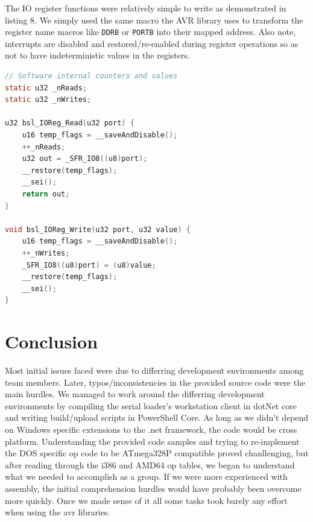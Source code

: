 \documentclass[11pt]{article}
\begin{document}
The IO register functions were relatively simple to write as demonstrated in listing 8. 
We simply used the same macro the AVR library uses to transform the register name macros like \lstinline[columns=fixed]{DDRB} or \lstinline[columns=fixed]{PORTB} into their mapped address.
Also note, interrupts are disabled and restored/re-enabled during register operations so as not to have indeterministic values in the registers.

\begin{center}
    \begin{lstlisting}[language=C, columns=fixed, caption=Register manipulation implementation from \_avr\_ioreg.c.]
// Software internal counters and values
static u32 _nReads;
static u32 _nWrites;

u32 bsl_IOReg_Read(u32 port) {
    u16 temp_flags = __saveAndDisable();
    ++_nReads;
    u32 out = _SFR_IO8((u8)port);
    __restore(temp_flags);
    __sei();
    return out;
} 

void bsl_IOReg_Write(u32 port, u32 value) {
    u16 temp_flags = __saveAndDisable();
    ++_nWrites;
    _SFR_IO8((u8)port) = (u8)value;
    __restore(temp_flags);
    __sei();
}
    \end{lstlisting}
\end{center}


\section{Conclusion}
Most initial issues faced were due to differring development environments among team members. Later, typos/inconsistencies in the provided source code were the main hurdles. We managed to work around the differring development environments by compiling the serial loader's workstation client in dotNet core and writing build/upload scripts in PowerShell Core. As long as we didn't depend on Windows specific extensions to the .net framework, the code would be cross platform. Understanding the provided code samples and trying to re-implement the DOS specific op code to be ATmega328P compatible proved chanllenging, but after reading through the i386 and AMD64 op tables, we began to understand what we needed to accomplish as a group. If we were more experienced with assembly, the initial comprehension hurdles would have probably been overcome more quickly. Once we made sense of it all some tasks took barely any effort when using the avr libraries. 
\end{document}
